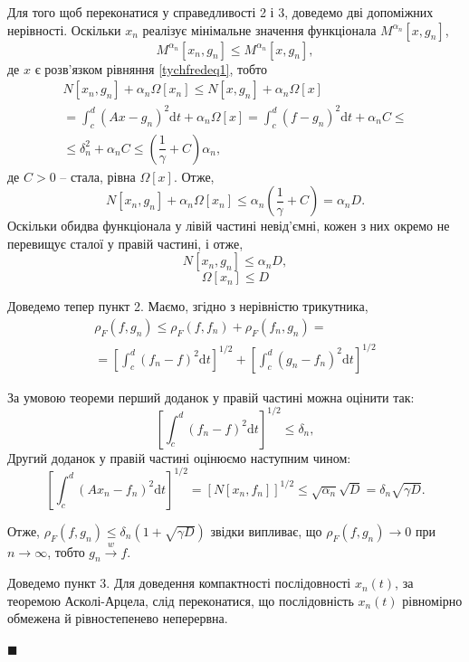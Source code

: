 \documentclass[14pt,twoside]{extreport}
\theoremstyle{mystyle}
\renewenvironment{proof}{{\bfseries Доведення.}}{$\blacksquare$}
\numberwithin{equation}{chapter}
\begin{document}
\begin{proof}
Для того щоб переконатися у справедливості 2 і 3, доведемо дві допоміжних нерівності. Оскільки $x_n$ реалізує мінімальне значення функціонала $M^{\alpha_n}[x, g_n]$,
\[
M^{\alpha_n}[x_n, g_n] \leqslant M^{\alpha_n}[x, g_n],
\]
де $x$ є розв'язком рівняння \eqref{tychfredeq1}, тобто
\begin{multline*}
 N[x_n, g_n] + \alpha_n \Omega[x_n] \leqslant N[x, g_n] + \alpha_n \Omega[x]\\
 = \int_{c}^{d} (Ax - g_n)^2 \mathrm{d}t + \alpha_n \Omega[x] = \int_{c}^{d} (f - g_n)^2 \mathrm{d}t + \alpha_n C \leqslant \\
 \leqslant \delta_n^2 + \alpha_n C \leqslant \left(\dfrac{1}{\gamma} + C\right) \alpha_n,
\end{multline*}
де $C > 0$ -- стала, рівна $\Omega[x]$. Отже,
\[
 N[x_n, g_n] + \alpha_n \Omega[x_n] \leqslant \alpha_n \left(\dfrac{1}{\gamma} + C\right) = \alpha_n D.
\]
Оскільки обидва функціонала у лівій частині невід'ємні, кожен з них окремо не перевищує сталої у правій частині, і отже,
\begin{equation}
 N[x_n, g_n]\leqslant \alpha_{n} D,
\end{equation}
\begin{equation}\label{omegaxn}
 \Omega[x_{n}]\leqslant D
\end{equation}

Доведемо тепер пункт 2. Маємо, згідно з нерівністю трикутника,
\begin{multline*}
\rho_{F}(f, g_n)\leqslant\rho_{F}(f, f_{n})+\rho_{F}(f_{n}, g_{n})=\\
= \left[\int_{c}^{d}(f_{n}-f)^{2}\mathrm{d}t\right]^{1/2} + \left[\int_{c}^{d}(g_{n}-f_{n})^{2}\mathrm{d}t\right]^{1/2}
\end{multline*}

За умовою теореми перший доданок у правій частині можна оцінити так:
$$
\left[\int_{c}^{d}(f_{n}-f)^{2}\mathrm{d}t\right]^{1/2} \leqslant \delta_{n},
$$
Другий доданок у правій частині оцінюємо наступним чином:
$$
\left[\int_{c}^{d}(Ax_{n}-f_{n})^{2}\mathrm{d}t\right]^{1/2} = \left[N[x_{n}, f_{n}]\right]^{1/2} \leqslant \sqrt{\alpha_{n}}\sqrt{D}=\delta_n\sqrt{\gamma D}.
$$

Отже, $\rho_{F}(f, g_n) \leqslant \delta_{n}(1+\sqrt{\gamma D})$ звідки випливає, що $\rho_{F}(f, g_{n})\to 0$ при $n \to\infty$, тобто $g_n \xrightarrow{w} f$.

Доведемо пункт 3. Для доведення компактності послідовності $x_n(t)$, за теоремою Асколі-Арцела, слід переконатися, що послідовність $x_n(t)$ рівномірно обмежена й рівностепенево неперервна.


\end{proof}
\end{document}
